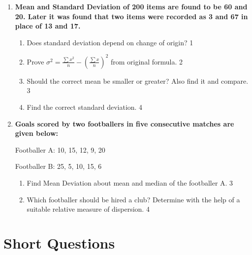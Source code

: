 \documentclass[a4paper,oneside]{book}
\begin{document}
\begin{enumerate}
 \item
	  \textbf{Mean and Standard Deviation of 200 items are found to be 60 and 20. Later it was found that two items were recorded as 3 and 67 in place of 13 and 17.} 
  
  \begin{enumerate}
    \item
	Does standard deviation depend on change of origin? \hfill 1
    \item
	Prove $\displaystyle \sigma^2 = \frac{\sum x^2}n -(\frac{\sum x}{n})^2$ from original formula. \hfill 2
    \item  
	Should the correct mean be smaller or greater? Also find it and compare.  \hfill 3
    \item
	Find the correct standard deviation. \hfill 4
  \end{enumerate}
      \item
  \textbf{Goals scored by two footballers in five consecutive matches are given below:}

    \begin{center}

    Footballer A: 10, 15, 12, 9, 20

    Footballer B: 25, 5, 10, 15, 6
    
    \end{center}
  \begin{enumerate}
    \item  
	Find Mean Deviation about mean and median of the footballer A.  \hfill 3
    \item
	Which footballer should be hired a club? Determine with the help of a suitable relative measure of dispersion. \hfill 4
\end{enumerate}

\end{enumerate}

\section{Short Questions}
\end{document}
